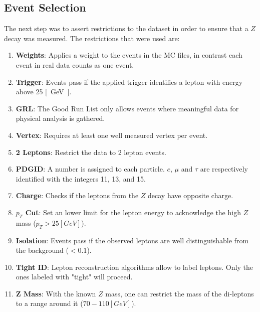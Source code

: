 \documentclass[12pt, a4paper, bibliography=totoc]{scrartcl}
\begin{document}
\begin{multicols}{2}
\subsection{Event Selection} 
The next step was to assert restrictions to the dataset in order to ensure that a $Z$ decay was measured.
The restrictions that were used are:
\begin{enumerate}
    \item \textbf{Weights}: Applies a weight to the events in the MC files, in contrast each event in real data counts as one event.
    \item \textbf{Trigger}: Events pass if the applied trigger identifies a lepton with energy above 25 \si{[GeV]}.
    \item \textbf{GRL}: The Good Run List only allows events where meaningful data for physical analysis is gathered.
    \item \textbf{Vertex}: Requires at least one well measured vertex per event.
    \item \textbf{2 Leptons}: Restrict the data to 2 lepton events.
    \item \textbf{PDGID}: A number is assigned to each particle. $e$, $\mu$ and $\tau$ are respectively identified with the integers 11, 13, and 15.
    \item \textbf{Charge}: Checks if the leptons from the $Z$ decay have opposite charge.
    \item \textbf{$p_{T}$ Cut}: Set an lower limit for the lepton energy to acknowledge the high $Z$ mass ($p_{T} > 25 \si{[GeV]}$).
    \item \textbf{Isolation}: Events pass if the observed leptons are well distinguishable from the background ($< 0.1$).
    \item \textbf{Tight ID}: Lepton reconstruction algorithms allow to label leptons. Only the ones labeled with "tight" will proceed.
    \item \textbf{Z Mass}: With the known $Z$ mass, one can restrict the mass of the di-leptons to a range around it ($70 - 110 \si{[GeV]}$). 
\end{enumerate}


\end{multicols}
\end{document}

